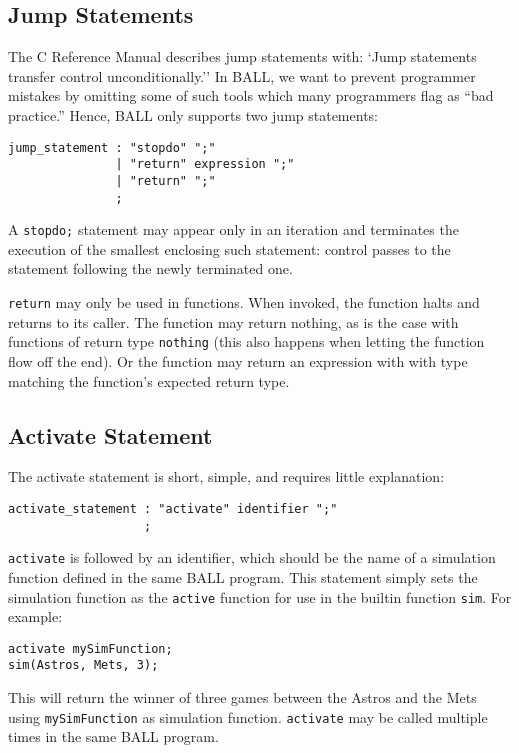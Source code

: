  \subsection{Jump Statements}
The C Reference Manual describes jump statements with: `Jump
statements transfer control unconditionally.'' In BALL, we want to
prevent programmer mistakes by omitting some of such tools which many
programmers flag as ``bad practice.'' Hence, BALL only supports two
jump statements:

\begin{verbatim}
jump_statement : "stopdo" ";"
               | "return" expression ";"
               | "return" ";"
               ;
\end{verbatim}

A \texttt{stopdo;} statement may appear only in an iteration and
terminates the execution of the smallest enclosing such statement:
control passes to the statement following the newly terminated one.

\texttt{return} may only be used in functions. When invoked, the
function halts and returns to its caller. The function may return
nothing, as is the case with functions of return type \texttt{nothing}
(this also happens when letting the function flow off the end). Or the
function may return an expression with with type matching the
function's expected return type.

\subsection{Activate Statement}\label{activateStmt}
The activate statement is short, simple, and requires little explanation:

\begin{verbatim}
activate_statement : "activate" identifier ";"
                   ;
\end{verbatim}

\texttt{activate} is followed by an identifier, which should be the name of a
simulation function defined in the same BALL program. This statement
simply sets the simulation function as the \texttt{active} function for use
in the builtin function \texttt{sim}. For example:

\begin{verbatim}
activate mySimFunction;
sim(Astros, Mets, 3);
\end{verbatim}

This will return the winner of three games between the Astros and the
Mets using \texttt{mySimFunction} as simulation
function. \texttt{activate} may be called multiple times in the same
BALL program.

